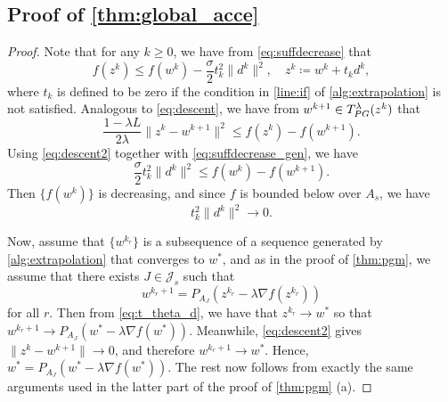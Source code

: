 \documentclass{article}
\theoremstyle{plain}
\theoremstyle{definition}
\theoremstyle{remark}
\newcommand{\J}{\mathcal{J}}
\newcommand{\Tpg}{T_{\rm PG}^{\lambda}}
\begin{document}
\subsection{Proof of \cref{thm:global_acce}}
\begin{proof}
	Note that for any $k\geq 0$, we have from \cref{eq:suffdecrease} that 
		\begin{equation}
		\label{eq:suffdecrease_gen}
		f(z^k) \leq f(w^k) - \frac{\sigma}{2}t_k^2 
		\|d^k\|^2, \quad z^k \coloneqq w^k+t_kd^k,
		\end{equation}
	where $t_k$ is defined to be zero if the condition in
	\cref{line:if} of \cref{alg:extrapolation} is not 
	satisfied. Analogous to \cref{eq:descent}, we have from 
	$w^{k+1} \in \Tpg (z^k)$ that
		\begin{equation}
		\label{eq:descent2}
		\frac{1-\lambda L}{2\lambda}\|z^k - w^{k+1}\|^2\leq f(z^k) -
		f(w^{k+1}).
		\end{equation}
	Using \cref{eq:descent2} together with \cref{eq:suffdecrease_gen}, we have 
		\begin{equation}
		\frac{\sigma}{2}t_k^2 \|d^k\|^2 \leq f(w^k) - f(w^{k+1}).
		\end{equation}
	Then $\{f(w^k)\}$ is decreasing, and since $f$ is bounded below over $A_s$, 
	we have 
		\begin{equation}
		\label{eq:t_theta_d}
		t_k^2\|d^k\|^2 \to 0.
		\end{equation}
	
	Now, assume that $\{w^{k_r}\}$ is a subsequence of a 
	sequence generated by \cref{alg:extrapolation} that converges to $w^*$, and 
	as in the proof of \cref{thm:pgm}, we assume
	that there exists $J\in\J_s$ such that
		\begin{equation}
		w^{k_r+1} = P_{A_J}(z^{k_r} - \lambda \nabla f(z^{k_r}))
		\end{equation}
	 for all $r$. Then from 
	 \cref{eq:t_theta_d}, we have that $z^{k_r} \to w^*$ so 
	 that $w^{k_r+1} \to P_{A_J}(w^* - \lambda \nabla f(w^*))$. Meanwhile, 
	 \cref{eq:descent2} gives $\|z^k-w^{k+1}\|\to 0$, and therefore 
	 $w^{k_r+1}\to w^*$. Hence, $w^* = P_{A_J}(w^* - \lambda \nabla f(w^*))$. 
	The rest now follows from exactly the same arguments used in the latter 
	part of the proof of \cref{thm:pgm} (a).
\end{proof}
\end{document}
